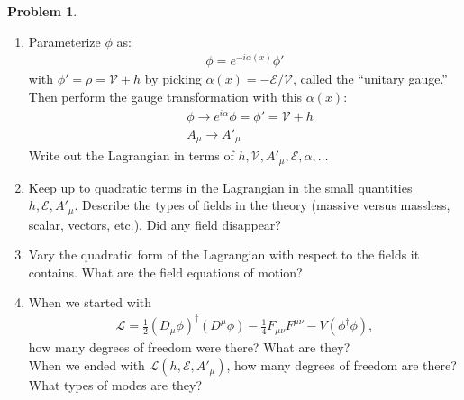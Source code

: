 \documentclass[a4paper,11pt]{article}
\numberwithin{equation}{section}
\theoremstyle{definition}
\newtheorem{prob}{Problem}[section]
\newcommand{\lag}{\mathcal{L}}
\begin{document}
\begin{prob}
\begin{enumerate}
		
		\item Parameterize $\phi$ as:
		\begin{align}
		\phi = e^{-i\alpha(x)}\phi'
		\end{align}
		with $\phi' = \rho = \mathcal{V} + h$ by picking $\alpha(x) = -\mathcal{E}/\mathcal{V}$, called the ``unitary gauge.'' Then perform the gauge transformation with this $\alpha(x)$:
		\begin{align}
		&\phi \to e^{i\alpha}\phi = \phi' = \mathcal{V}+ h\\
		&A_\mu \to A'_\mu
		\end{align}
		Write out the Lagrangian in terms of $h,\mathcal{V}, A'_\mu, \mathcal{E}, \alpha,\dots$\\
		
		
		
		
		\item Keep up to quadratic terms in the Lagrangian in the small quantities $h,\mathcal{E}, A'_\mu$. Describe the types of fields in the theory (massive versus massless, scalar, vectors, etc.). Did any field disappear?\\
		
		
		\item Vary the quadratic form of the Lagrangian with respect to the fields it contains. What are the field equations of motion?\\
		
		
		\item When we started with 
		\begin{align}
		\lag = \frac{1}{2}(D_\mu\phi)^\dagger(D^\mu\phi) - \frac{1}{4}F_{\mu\nu}F^{\mu\nu} - V(\phi^\dagger\phi),
		\end{align}
		how many degrees of freedom were there? What are they?\\
		
		When we ended with $\lag(h,\mathcal{E}, A'_\mu)$, how many degrees of freedom are there? What types of modes are they?\\
		
	\end{enumerate}


\end{prob}
\end{document}
